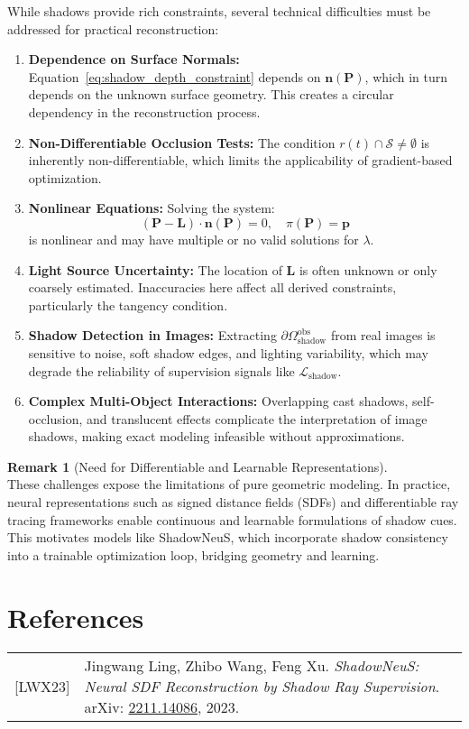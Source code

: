\documentclass[12pt]{article}
\newcommand{\vect}[1]{\bm{#1}}
\theoremstyle{definition}
\newtheorem{remark}{Remark}[subsection]
\begin{document}
While shadows provide rich constraints, several technical difficulties must be addressed for practical reconstruction:

\begin{enumerate}[label=\arabic*.]
    \item \textbf{Dependence on Surface Normals:} Equation~\eqref{eq:shadow_depth_constraint} depends on $\vect{n}(\vect{P})$, which in turn depends on the unknown surface geometry. This creates a circular dependency in the reconstruction process.
    \item \textbf{Non-Differentiable Occlusion Tests:} The condition $r(t) \cap \mathcal{S} \neq \emptyset$ is inherently non-differentiable, which limits the applicability of gradient-based optimization.
    \item \textbf{Nonlinear Equations:} Solving the system:
    \[
    (\vect{P} - \vect{L}) \cdot \vect{n}(\vect{P}) = 0, \quad \pi(\vect{P}) = \vect{p}
    \]
    is nonlinear and may have multiple or no valid solutions for $\lambda$.
    \item \textbf{Light Source Uncertainty:} The location of $\vect{L}$ is often unknown or only coarsely estimated. Inaccuracies here affect all derived constraints, particularly the tangency condition.
    \item \textbf{Shadow Detection in Images:} Extracting $\partial\Omega_{\text{shadow}}^{\text{obs}}$ from real images is sensitive to noise, soft shadow edges, and lighting variability, which may degrade the reliability of supervision signals like $\mathcal{L}_{\text{shadow}}$.
    \item \textbf{Complex Multi-Object Interactions:} Overlapping cast shadows, self-occlusion, and translucent effects complicate the interpretation of image shadows, making exact modeling infeasible without approximations.
\end{enumerate}

\begin{remark}[Need for Differentiable and Learnable Representations] \label{rmk:differentiable} ~\\
These challenges expose the limitations of pure geometric modeling. In practice, neural representations such as signed distance fields (SDFs) and differentiable ray tracing frameworks enable continuous and learnable formulations of shadow cues. This motivates models like ShadowNeuS, which incorporate shadow consistency into a trainable optimization loop, bridging geometry and learning.
\end{remark}









\newpage

\section*{References}
\begin{tabular}{@{}p{} p{}}
\hypertarget{[LWX23]}{[LWX23]} & Jingwang Ling, Zhibo Wang, Feng Xu. \textit{ShadowNeuS: Neural SDF Reconstruction by Shadow Ray Supervision}. arXiv: \href{https://arxiv.org/abs/2211.14086}{2211.14086}, 2023.
\end{tabular}
\end{document}
